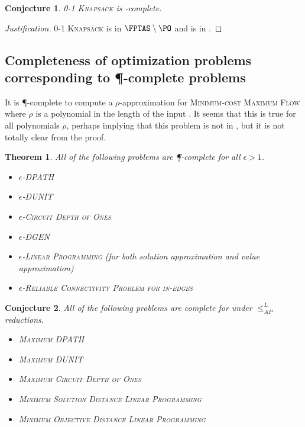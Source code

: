 \documentclass[]{article}
\theoremstyle{plain}
\newtheorem{conjecture}{Conjecture}
\newtheorem{theorem}{Theorem}
\theoremstyle{definition}
\newenvironment{justification}{\begin{proof}[Justification]}{\end{proof}}
\newcommand{\APr}{\leq_{AP}^{L}}
\begin{document}
\begin{conjecture}
  \textsc{0-1 Knapsack} is \FNCAS-complete.
\end{conjecture}
\begin{justification}
  \textsc{0-1 Knapsack} is in $\FPTAS\setminus\PO$ \cite[Section~3.2]{ep10} and is in \FNCAS{} \cite[Theorem~2]{mayr88}.
\end{justification}

\subsection{Completeness of optimization problems corresponding to \texorpdfstring{\P}{P}-complete problems}

It is \P-complete to compute a $\rho$-approximation for \textsc{Minimum-cost Maximum Flow} where $\rho$ is a polynomial in the length of the input \cite{sw92}.
It seems that this is true for all polynomials $\rho$, perhaps implying that this problem is not in \polyApxNCO{}, but it is not totally clear from the proof.

\begin{theorem}
  All of the following problems are \P-complete for all $\epsilon > 1$.
  \begin{itemize}
  \item \textsc{$\epsilon$-DPATH} \cite[Theorem~1]{ss89}
  \item \textsc{$\epsilon$-DUNIT} \cite[Theorem~2]{ss89}
  \item \textsc{$\epsilon$-Circuit Depth of Ones} \cite{kl88}
  \item \textsc{$\epsilon$-DGEN} \cite[Theorem~4]{ss89}
  \item \textsc{$\epsilon$-Linear Programming} (for both solution approximation and value approximation) \cite{serna91}
  \item \textsc{$\epsilon$-Reliable Connectivity Problem for in-edges} \cite[Theorem~4]{kks91}
  \end{itemize}
\end{theorem}

\begin{conjecture}
  All of the following problems are complete for \polyApxNCOp{} under $\APr$ reductions.
  \begin{itemize}
  \item \textsc{Maximum DPATH}
  \item \textsc{Maximum DUNIT}
  \item \textsc{Maximum Circuit Depth of Ones}
  \item \textsc{Minimum Solution Distance Linear Programming}
  \item \textsc{Minimum Objective Distance Linear Programming}
  \end{itemize}
\end{conjecture}
\end{document}
